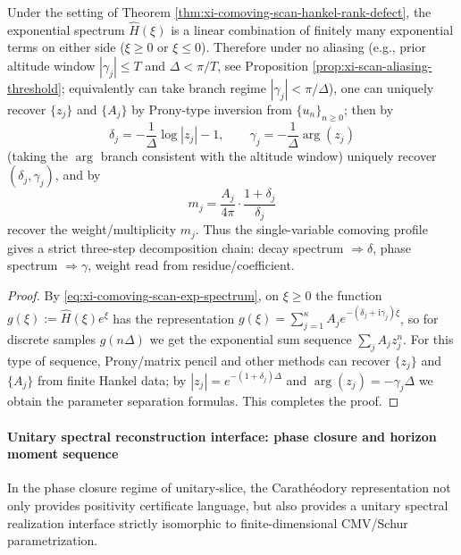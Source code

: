 \begin{theorem}\label{thm:xi-comoving-scan-exponential-spectral-separation}
Under the setting of Theorem \ref{thm:xi-comoving-scan-hankel-rank-defect}, the exponential spectrum \(\widehat H(\xi)\) is a linear combination of finitely many exponential terms on either side (\(\xi\ge 0\) or \(\xi\le 0\)).
Therefore under no aliasing (e.g., prior altitude window \(|\gamma_j|\le T\) and \(\Delta<\pi/T\), see Proposition \ref{prop:xi-scan-aliasing-threshold}; equivalently can take branch regime \(|\gamma_j|<\pi/\Delta\)), one can uniquely recover \(\{z_j\}\) and \(\{A_j\}\) by Prony-type inversion from \(\{u_n\}_{n\ge 0}\); then by
\[
\boxed{\;
\delta_j= -\frac{1}{\Delta}\log|z_j|-1,\qquad
\gamma_j=-\frac{1}{\Delta}\arg(z_j)\;}
\]
(taking the \(\arg\) branch consistent with the altitude window) uniquely recover \((\delta_j,\gamma_j)\), and by
\[
\boxed{\;
m_j=\frac{A_j}{4\pi}\cdot\frac{1+\delta_j}{\delta_j}\;}
\]
recover the weight/multiplicity \(m_j\).
Thus the single-variable comoving profile gives a strict three-step decomposition chain: decay spectrum \(\Rightarrow\delta\), phase spectrum \(\Rightarrow\gamma\), weight read from residue/coefficient.
\end{theorem}

\begin{proof}
By \eqref{eq:xi-comoving-scan-exp-spectrum}, on \(\xi\ge 0\) the function \(g(\xi):=\widehat H(\xi)e^{\xi}\) has the representation
\(
g(\xi)=\sum_{j=1}^{\kappa}A_j e^{-(\delta_j+\mathrm{i}\gamma_j)\xi}
\),
so for discrete samples \(g(n\Delta)\) we get the exponential sum sequence \(\sum_j A_j z_j^n\).
For this type of sequence, Prony/matrix pencil and other methods can recover \(\{z_j\}\) and \(\{A_j\}\) from finite Hankel data; by \(|z_j|=e^{-(1+\delta_j)\Delta}\) and \(\arg(z_j)=-\gamma_j\Delta\) we obtain the parameter separation formulas. This completes the proof.
\end{proof}



\paragraph{Unitary spectral reconstruction interface: phase closure and horizon moment sequence}
In the phase closure regime of unitary-slice, the Carath\'eodory representation not only provides positivity certificate language, but also provides a unitary spectral realization interface strictly isomorphic to finite-dimensional CMV/Schur parametrization.

